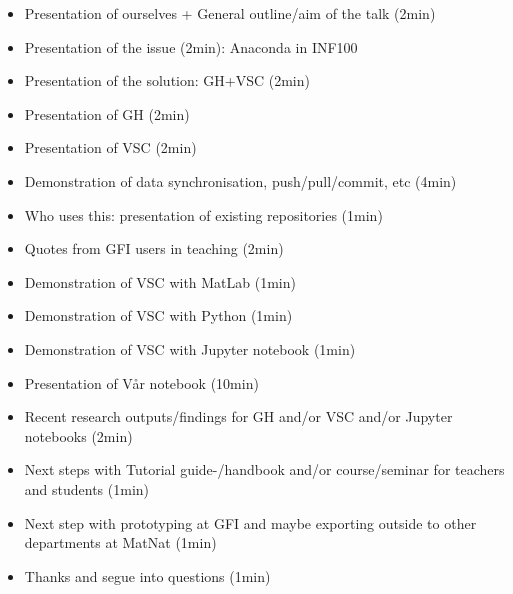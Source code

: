 \documentclass{article}
\begin{document}
\begin{itemize}
    \item Presentation of ourselves + General outline/aim of the talk (2min)
    \item Presentation of the issue (2min): Anaconda in INF100
    \item Presentation of the solution: GH+VSC (2min)
    \item Presentation of GH (2min)
    \item Presentation of VSC (2min)
    \item Demonstration of data synchronisation, push/pull/commit, etc (4min)
    \item Who uses this: presentation of existing repositories (1min)
    \item Quotes from GFI users in teaching (2min)
    \item Demonstration of VSC with MatLab (1min)
    \item Demonstration of VSC with Python (1min)
    \item Demonstration of VSC with Jupyter notebook (1min)
    \item Presentation of Vår notebook (10min)
    \item Recent research outputs/findings for GH and/or VSC and/or Jupyter notebooks (2min)
    \item Next steps with Tutorial guide-/handbook and/or course/seminar for teachers and students (1min)
    \item Next step with prototyping at GFI and maybe exporting outside to other departments at MatNat (1min)
    \item Thanks and segue into questions (1min)
\end{itemize}
\end{document}
